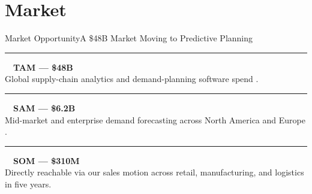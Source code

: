 \section{Market}

\begin{frame}{Market Opportunity}{A \$48B Market Moving to Predictive Planning}

  \begin{minipage}[t]{0.42\textwidth}
    \centering
    \vspace{0.3cm}
  \end{minipage}\hfill
  \begin{minipage}[t]{0.53\textwidth}
    \vspace{0.1cm}

    \textcolor{accentViolet}{\rule{0.3cm}{0.3cm}}\ \ \textbf{\textcolor{textLight}{TAM --- \$48B}} \\
    {\small\textcolor{textMuted}{Global supply-chain analytics and demand-planning software spend \cite{meridian2026supplychain}.}}

    \vspace{0.35cm}

    \textcolor{accentViolet}{\rule{0.3cm}{0.3cm}}\ \ \textbf{\textcolor{textLight}{SAM --- \$6.2B}} \\
    {\small\textcolor{textMuted}{Mid-market and enterprise demand forecasting across North America and Europe \cite{nexa2025forecasting}.}}

    \vspace{0.35cm}

    \textcolor{accentMint}{\rule{0.3cm}{0.3cm}}\ \ \textbf{\textcolor{textLight}{SOM --- \$310M}} \\
    {\small\textcolor{textMuted}{Directly reachable via our sales motion across retail, manufacturing, and logistics in five years.}}
  \end{minipage}

\end{frame}

